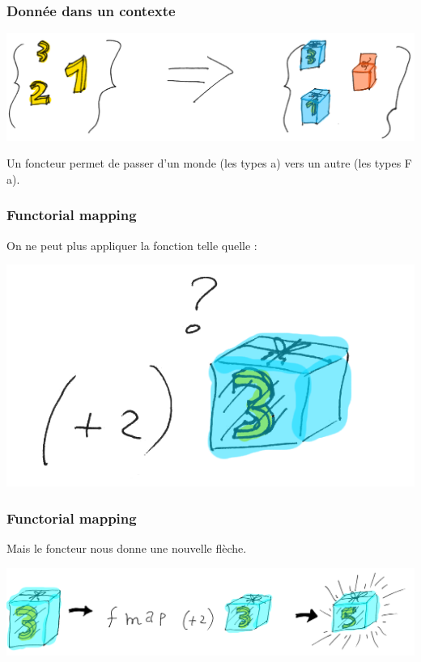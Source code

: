 \documentclass{beamer}
\begin{document}
\begin{frame}
\frametitle{Donnée dans un contexte}

\begin{center}
\includegraphics[scale=0.25]{a2fa.png}
\end{center}

\begin{block}{}
Un foncteur permet de passer d'un monde (les types a) vers un autre (les types F a).
\end{block}

\end{frame}

\begin{frame}
\frametitle{Functorial mapping}
On ne peut plus appliquer la fonction telle quelle :

\begin{center}
\includegraphics[scale=0.3]{wrong_type.png}
\end{center}
\end{frame}

\begin{frame}
\frametitle{Functorial mapping}
Mais le foncteur nous donne une nouvelle flèche.
\begin{center}
\includegraphics[scale=0.19]{f_fct.png}
\end{center}
\end{frame}
\end{document}
